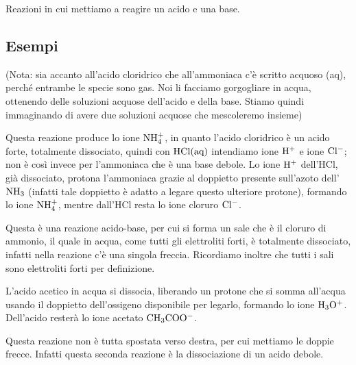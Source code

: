 Reazioni in cui mettiamo a reagire un acido e una base.
\subsection{Esempi}

\vspace{0.2cm}(Nota: sia accanto all'acido cloridrico che all'ammoniaca c'è scritto acquoso (aq), perché entrambe le specie sono gas. Noi li facciamo gorgogliare in acqua, ottenendo delle soluzioni acquose dell'acido e della base. Stiamo quindi immaginando di avere due soluzioni acquose che mescoleremo insieme)

Questa reazione produce lo ione $\rm NH_4^+$, in quanto l'acido cloridrico è un acido forte, totalmente dissociato, quindi con $\rm HCl(aq)$ intendiamo ione $\rm H^+$ e ione $\rm Cl^-$; non è così invece per l'ammoniaca che è una base debole. Lo ione $\rm H^+$ dell'HCl, già dissociato, protona l'ammoniaca grazie al doppietto presente sull'azoto dell'$\rm NH_3$ (infatti tale doppietto è adatto a legare questo ulteriore protone), formando lo ione $\rm NH_4^+$, mentre dall'HCl resta lo ione cloruro $\rm Cl^-$.

Questa è una reazione acido-base, per cui si forma un sale che è il cloruro di ammonio, il quale in acqua, come tutti gli elettroliti forti, è totalmente dissociato, infatti nella reazione c'è una singola freccia. Ricordiamo inoltre che tutti i sali sono elettroliti forti per definizione.

\vspace{0.2cm}

\vspace{0.2cm}L'acido acetico in acqua si dissocia, liberando un protone che si somma all'acqua usando il doppietto dell'ossigeno disponibile per legarlo, formando lo ione $\rm H_3O^+$. Dell'acido resterà lo ione acetato $\rm CH_3COO^-$.

Questa reazione non è tutta spostata verso destra, per cui mettiamo le doppie frecce. Infatti questa seconda reazione è la dissociazione di un acido debole.

\vspace{0.2cm}

